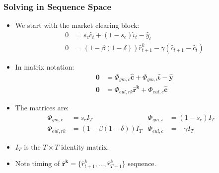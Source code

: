 \documentclass[english,xcolor=svgnames]{beamer}
\begin{document}
\begin{frame}
    \frametitle{Solving in Sequence Space}
		\begin{itemize}
			\item We start with the market clearing block:
			\begin{align*}
				 	0&=s_c\hat{c}_t + (1-s_c)\hat{\iota}_t - \hat{y}_t \\
					0&= (1-\beta(1-\delta))\hat{r}_{t+1}^k -  \gamma (\hat{c}_{t+1} - \hat{c}_{t})
			\end{align*}
			\item In matrix notation:
			\begin{align*}
				\mathbf{0} &= \Phi_{gm,c}\mathbf{\hat{c}} + \Phi_{gm,\iota}\mathbf{\hat{\iota}} - \mathbf{\hat{y}} \\
				\mathbf{0} &= \Phi_{eul,rk}\mathbf{\hat{r}^k} + \Phi_{eul,c}\mathbf{\hat{c}} 
			\end{align*}
			\item The matrices are:
			\begin{align*}
				\Phi_{gm,c} &= s_c I_T & \Phi_{gm,\iota} &= (1-s_c)I_T \quad \\
				\Phi_{eul,rk} &= (1-\beta(1-\delta))I_T & \Phi_{eul,c} &= -\gamma I_T 
			\end{align*}
			\item  $I_T$ is the $T\times T$ identity matrix. 
			\item Note timing of $\mathbf{\hat{r}^k}=\{\hat{r}^{k}_{t+1},...,\hat{r}^{k}_{T+1}\}$ sequence.
		\end{itemize}
\end{frame}
\end{document}
